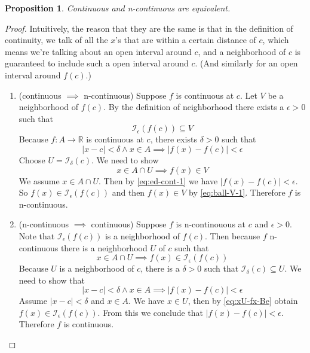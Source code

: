 \documentclass{article}
\newtheorem{proposition}[theorem]{Proposition}
\newcommand{\Reals}[0]{\mathbb{R}}
\begin{document}
\begin{proposition}
  Continuous and n-continuous are equivalent.
\end{proposition}
\begin{proof}
   Intuitively, the reason that they are the same is that in the
   definition of continuity, we talk of all the $x$'s that are within
   a certain distance of $c$, which means we're talking about an open
   interval around $c$, and a neighborhood of $c$ is guaranteed to
   include such a open interval around $c$. (And similarly for an open
   interval around $f(c)$.)
   \begin{enumerate}
   \item (continuous $\implies$ n-continuous)
     Suppose $f$ is continuous at $c$.
     Let $V$ be a neighborhood of $f(c)$.
     By the definition of neighborhood there exists a $\epsilon > 0$ such that
     \begin{equation} \label{eq:ball-V-1}
     \mathcal{I}_\epsilon(f(c)) \subseteq V
     \end{equation}
     Because $f : A \to \Reals$ is continuous at $c$, 
     there exists $\delta > 0$ such that
     \begin{equation} \label{eq:ed-cont-1}
     |x - c| < \delta \land x \in A \implies |f(x) - f(c)| < \epsilon
     \end{equation}
     Choose $U=\mathcal{I}_\delta(c)$. We need to show
     \[
     x \in A \cap U \implies f(x) \in V
     \]
     We assume $x \in A \cap U$. Then by \eqref{eq:ed-cont-1} we have
     $|f(x) - f(c)| < \epsilon$. So $f(x) \in \mathcal{I}_\epsilon(f(c))$
     and then $f(x) \in V$ by \eqref{eq:ball-V-1}.
     Therefore $f$ is n-continuous.

   \item (n-continuous $\implies$ continuous) Suppose $f$ is
     n-continouous at $c$ and $\epsilon > 0$. Note that
     $\mathcal{I}_\epsilon(f(c))$ is a neighborhood of $f(c)$. Then because $f$
     n-continuous there is a neighborhood $U$ of $c$ such that
     \begin{equation}\label{eq:xU-fx-Be}
       x \in A \cap U \implies f(x) \in \mathcal{I}_\epsilon(f(c))
     \end{equation}
     Because $U$ is a neighborhood of $c$, there is a $\delta > 0$
     such that $\mathcal{I}_\delta(c) \subseteq U$. We need to show that
     \[
     |x - c| < \delta \land x \in A \implies |f(x) - f(c)| < \epsilon
     \]
     Assume $|x - c| < \delta$ and $x \in A$.
     We have $x \in U$, then by \eqref{eq:xU-fx-Be} obtain
     $f(x) \in \mathcal{I}_\epsilon(f(c))$. From this we conclude that
     $|f(x) - f(c)| < \epsilon$. Therefore $f$ is continuous.

   \end{enumerate}
\end{proof}
\end{document}
